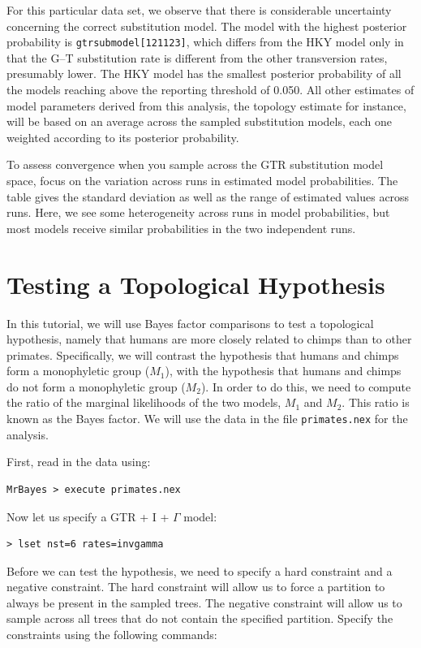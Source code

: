 \documentclass[12pt]{book}
\begin{document}
For this particular data set, we observe that there is considerable uncertainty concerning the correct
substitution model. The model with the highest posterior probability is \texttt{gtrsubmodel[121123]}, which differs
from the HKY model only in that the G--T substitution rate is different from the other transversion rates,
presumably lower. The HKY model has the smallest posterior probability of all the models
reaching above the reporting threshold of 0.050. All other estimates of model parameters derived from this
analysis, the topology estimate for instance, will be based on an average across the sampled substitution models,
each one weighted according to its posterior probability.

To assess convergence when you sample across the GTR substitution model space, focus on the variation
across runs in estimated model probabilities. The table gives the standard deviation as well as the range
of estimated values across runs. Here, we see some heterogeneity across runs in model probabilities, but
most models receive similar probabilities in the two independent runs.

\section{Testing a Topological Hypothesis}

In this tutorial, we will use Bayes factor comparisons to test a topological hypothesis, namely that humans are more closely related to chimps than to other primates. Specifically, we will contrast the hypothesis that humans and chimps form
a monophyletic group ($M_1$), with the hypothesis that humans and chimps do not form a monophyletic group ($M_2$).
In order to do this, we need to compute the ratio of the marginal likelihoods of the two models, $M_1$ and $M_2$.
This ratio is known as the Bayes factor. We will use the data in the file \texttt{primates.nex} for the analysis.

First, read in the data using:

\begin{verbatim}
MrBayes > execute primates.nex
\end{verbatim}

Now let us specify a GTR + I + $\Gamma$ model:

\begin{verbatim}
> lset nst=6 rates=invgamma
\end{verbatim}

Before we can test the hypothesis, we need to specify a hard constraint and a negative constraint. The hard constraint
will allow us to force a partition to always be present in the sampled trees. The negative constraint will allow us to sample
across all trees that do not contain the specified partition. Specify the constraints using the following commands:
\end{document}
